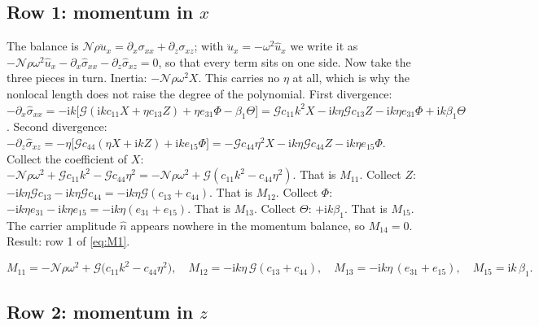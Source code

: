 \documentclass[11pt]{article}
\makeatletter
\newif\ifshowworked
\newenvironment{worked}{%
  \ifshowworked\par\smallskip\noindent\textit{Working.}\par\smallskip\else
  \setbox\z@\vbox\bgroup\fi}{\ifshowworked\par\smallskip\else\egroup\fi}
\newcommand{\ii}{\mathrm{i}}
\newcommand{\Ncal}{\mathcal{N}}
\newcommand{\Gcal}{\mathcal{G}}
\makeatother
\begin{document}
\subsection*{Row 1: momentum in $x$}

\begin{worked}
The balance is $\Ncal\rho\ddot u_x=\partial_x\sigma_{xx}+\partial_z\sigma_{xz}$; with
$\ddot u_x=-\omega^2\hat u_x$ we write it as
$-\Ncal\rho\omega^2\hat u_x-\partial_x\hat\sigma_{xx}-\partial_z\hat\sigma_{xz}=0$, so that every term
sits on one side. Now take the three pieces in turn.
Inertia: $-\Ncal\rho\omega^2X$. This carries no $\eta$ at all, which is why the nonlocal length does not
raise the degree of the polynomial.
First divergence: $-\partial_x\hat\sigma_{xx}=-\ii k\bigl[\Gcal(\ii kc_{11}X+\eta c_{13}Z)
+\eta e_{31}\Phi-\beta_1\Theta\bigr]
=\Gcal c_{11}k^2X-\ii k\eta\Gcal c_{13}Z-\ii k\eta e_{31}\Phi+\ii k\beta_1\Theta$.
Second divergence: $-\partial_z\hat\sigma_{xz}=-\eta\bigl[\Gcal c_{44}(\eta X+\ii kZ)
+\ii k e_{15}\Phi\bigr]=-\Gcal c_{44}\eta^2X-\ii k\eta\Gcal c_{44}Z-\ii k\eta e_{15}\Phi$.
Collect the coefficient of $X$: $-\Ncal\rho\omega^2+\Gcal c_{11}k^2-\Gcal c_{44}\eta^2
=-\Ncal\rho\omega^2+\Gcal(c_{11}k^2-c_{44}\eta^2)$. That is $M_{11}$.
Collect $Z$: $-\ii k\eta\Gcal c_{13}-\ii k\eta\Gcal c_{44}=-\ii k\eta\Gcal(c_{13}+c_{44})$.
That is $M_{12}$.
Collect $\Phi$: $-\ii k\eta e_{31}-\ii k\eta e_{15}=-\ii k\eta(e_{31}+e_{15})$. That is $M_{13}$.
Collect $\Theta$: $+\ii k\beta_1$. That is $M_{15}$.
The carrier amplitude $\hat n$ appears nowhere in the momentum balance, so $M_{14}=0$.
Result: row 1 of \eqref{eq:M1}.
\end{worked}

\begin{equation}\label{eq:M1}
M_{11}=-\Ncal\rho\omega^2+\Gcal\bigl(c_{11}k^2-c_{44}\eta^2\bigr),\quad
M_{12}=-\ii k\eta\,\Gcal(c_{13}+c_{44}),\quad
M_{13}=-\ii k\eta\,(e_{31}+e_{15}),\quad
M_{15}=\ii k\,\beta_1 .
\label{eq:M1}
\end{equation}

\subsection*{Row 2: momentum in $z$}
\end{document}
